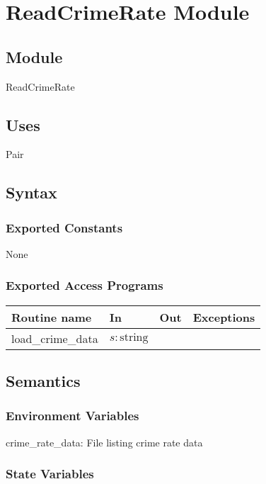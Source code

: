\documentclass[12pt]{article}
\begin{document}
\newpage


\section* {ReadCrimeRate Module}

\subsection* {Module}

ReadCrimeRate

\subsection* {Uses}

Pair

\subsection* {Syntax}

\subsubsection* {Exported Constants}

None

\subsubsection* {Exported Access Programs}

\begin{tabular}{| l | l | l | l |}
\hline
\textbf{Routine name} & \textbf{In} & \textbf{Out} & \textbf{Exceptions}\\
\hline
load\_crime\_data & $s: \mbox{string}$ & ~ & ~\\
\hline
\end{tabular}

\subsection* {Semantics}

\subsubsection* {Environment Variables}

crime\_rate\_data: File listing crime rate data

\subsubsection* {State Variables}
\end{document}
